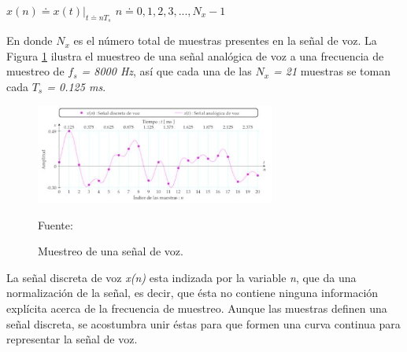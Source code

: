 \begin{enumerate}
\begin{enumerate}
\begin{center}
$x(n) \doteq x(t) \textbf{|}_{t \doteq nT_{s}}$ \hspace{1cm} $n \doteq 0,1,2,3,...,N_{x} - 1$
\end{center}
En donde $N_{x}$ es el número total de muestras presentes en la señal de voz. La Figura \ref{fig:figura2.10} ilustra el muestreo de una señal analógica de voz a una frecuencia de muestreo de \textit{$f_{s}$ = 8000 Hz}, así que cada una de las \textit{$N_{x}$ = 21} muestras se toman cada \textit{$T_{s}$ = 0.125 ms}.
\vskip 0.5cm
\begin{figure}[ht]
\begin{center}
\includegraphics[width=0.7\textwidth]{Imagenes/Cap2/image010}
\end{center}
\begin{center}
\vskip -0.5cm
\caption{\small{Muestreo de una señal de voz.}}
\label{fig:figura2.10}
{\small{Fuente: \cite{claudio}}}
\end{center}
\end{figure}

La señal discreta de voz \textit{x(n)} esta indizada por la variable \textit{n}, que da una normalización de la señal, es decir, que ésta no contiene ninguna información explícita acerca de la frecuencia de muestreo. Aunque las muestras definen una señal discreta, se acostumbra unir éstas para que formen una curva continua para representar la señal de voz.


\end{enumerate}
\end{enumerate}
